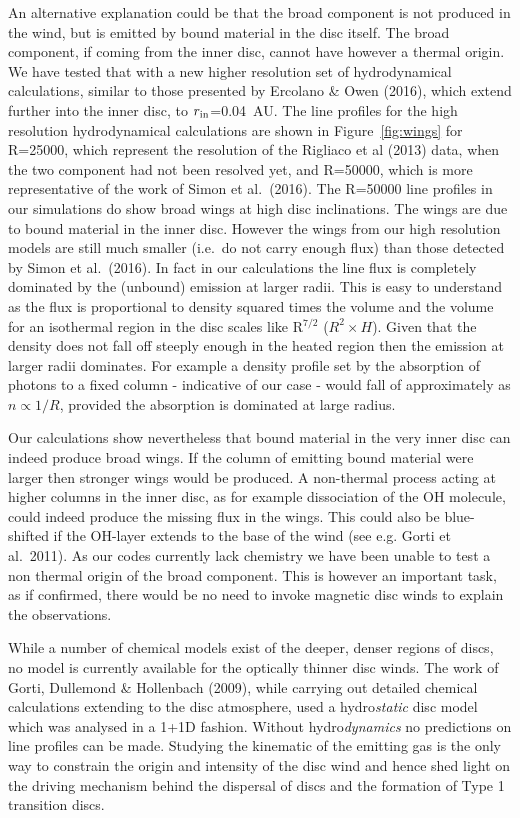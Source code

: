 \documentclass[10pt,fleqn,twoside]{article}
\begin{document}
An alternative explanation could be that the broad
component is not produced in the wind, but is emitted by bound
material in the disc itself. The broad component, if coming from the
inner disc, cannot have however a thermal origin. We have tested that
with a new higher resolution set of hydrodynamical calculations,
similar to those presented by Ercolano \& Owen (2016), which
extend further into the inner disc, to $r_{\rm in}$=0.04~AU. The line
profiles for the high resolution hydrodynamical calculations are shown
in Figure~\ref{fig:wings} for R=25000, which represent the resolution of the
Rigliaco et al (2013) data, when the two component had not been
resolved yet, and R=50000, which is more representative
of the work of Simon et al.\ (2016). The
R=50000 line profiles in our simulations do show broad wings at high disc
inclinations. The wings are due to bound material in the inner
disc. However the wings from our high resolution models are still much
smaller (i.e.\ do not carry enough flux) than those detected by
Simon et al.\ (2016). In fact in our calculations the line flux
is completely dominated by the (unbound) emission at larger
radii. This is easy to understand as the flux is proportional to
density squared times the volume and the volume for an isothermal
region in the disc scales like R$^{7/2}$ ($R^2\times H$). Given that
the density does not fall off steeply enough in the heated region then
the emission at larger radii dominates. For 
example a density profile set by the absorption of photons to a fixed
column - indicative of our case - would fall of approximately as
$n\propto1/R$, provided the absorption is dominated at large radius.

Our calculations show nevertheless that bound material in the very
inner disc can indeed produce broad wings. If the column of emitting
bound material were larger then stronger wings would be produced. A
non-thermal process acting at higher columns in the inner disc, as for
example dissociation of the OH molecule, could
indeed produce the missing flux in the wings. This could also be
blue-shifted if the OH-layer extends to the base of the wind (see e.g.
Gorti et al.\ 2011). As our codes currently
lack chemistry we have been unable to test a non thermal
origin of the broad component. This is however an important task, as
if confirmed, there would be no need to invoke magnetic disc winds to
explain the observations.  

 While a number of chemical models exist
of the deeper, denser regions of discs, no model is currently
available for the optically thinner disc winds. The work of Gorti, Dullemond \&
Hollenbach (2009), while carrying out detailed chemical calculations
extending to the disc atmosphere, used a hydro{\it static} disc model which
was analysed in a 1+1D fashion. Without hydro{\it dynamics} no predictions
on line profiles can be made.  
Studying the kinematic of the emitting gas is the only way to
constrain the origin and intensity of the disc wind and hence shed
light on the driving mechanism behind the dispersal of discs and the
formation of Type 1 transition discs. 
\end{document}
